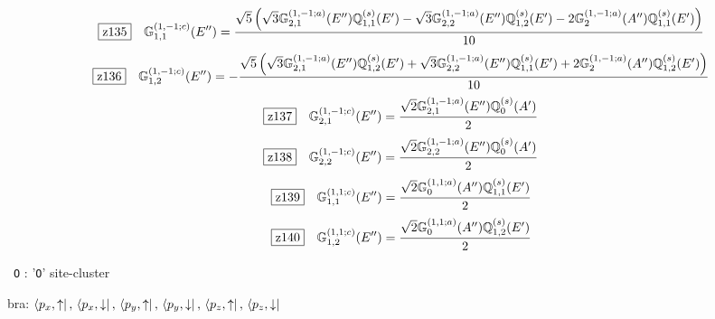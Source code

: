 \documentclass[fleqn,10pt,landscape]{jsarticle}
\begin{document}
\begin{dmath*}
\hspace*{3mm}\fbox{z135}\quad \mathbb{G}_{1,1}^{(1,-1;c)}(E^{\prime\prime})=\frac{\sqrt{5} \left(\sqrt{3} \mathbb{G}_{2,1}^{(1,-1;a)}(E^{\prime\prime}) \mathbb{Q}_{1,1}^{(s)}(E^{\prime}) - \sqrt{3} \mathbb{G}_{2,2}^{(1,-1;a)}(E^{\prime\prime}) \mathbb{Q}_{1,2}^{(s)}(E^{\prime}) - 2 \mathbb{G}_{2}^{(1,-1;a)}(A^{\prime\prime}) \mathbb{Q}_{1,1}^{(s)}(E^{\prime})\right)}{10}
\end{dmath*}
\begin{dmath*}
\hspace*{3mm}\fbox{z136}\quad \mathbb{G}_{1,2}^{(1,-1;c)}(E^{\prime\prime})=- \frac{\sqrt{5} \left(\sqrt{3} \mathbb{G}_{2,1}^{(1,-1;a)}(E^{\prime\prime}) \mathbb{Q}_{1,2}^{(s)}(E^{\prime}) + \sqrt{3} \mathbb{G}_{2,2}^{(1,-1;a)}(E^{\prime\prime}) \mathbb{Q}_{1,1}^{(s)}(E^{\prime}) + 2 \mathbb{G}_{2}^{(1,-1;a)}(A^{\prime\prime}) \mathbb{Q}_{1,2}^{(s)}(E^{\prime})\right)}{10}
\end{dmath*}
\begin{dmath*}
\hspace*{3mm}\fbox{z137}\quad \mathbb{G}_{2,1}^{(1,-1;c)}(E^{\prime\prime})=\frac{\sqrt{2} \mathbb{G}_{2,1}^{(1,-1;a)}(E^{\prime\prime}) \mathbb{Q}_{0}^{(s)}(A^{\prime})}{2}
\end{dmath*}
\begin{dmath*}
\hspace*{3mm}\fbox{z138}\quad \mathbb{G}_{2,2}^{(1,-1;c)}(E^{\prime\prime})=\frac{\sqrt{2} \mathbb{G}_{2,2}^{(1,-1;a)}(E^{\prime\prime}) \mathbb{Q}_{0}^{(s)}(A^{\prime})}{2}
\end{dmath*}
\begin{dmath*}
\hspace*{3mm}\fbox{z139}\quad \mathbb{G}_{1,1}^{(1,1;c)}(E^{\prime\prime})=\frac{\sqrt{2} \mathbb{G}_{0}^{(1,1;a)}(A^{\prime\prime}) \mathbb{Q}_{1,1}^{(s)}(E^{\prime})}{2}
\end{dmath*}
\begin{dmath*}
\hspace*{3mm}\fbox{z140}\quad \mathbb{G}_{1,2}^{(1,1;c)}(E^{\prime\prime})=\frac{\sqrt{2} \mathbb{G}_{0}^{(1,1;a)}(A^{\prime\prime}) \mathbb{Q}_{1,2}^{(s)}(E^{\prime})}{2}
\end{dmath*}
\vspace{5mm}

\noindent\textbullet\, \texttt{O} : '\texttt{O}' site-cluster

\noindent\quad * bra: $\bra{p_{x},\uparrow},\, \bra{p_{x},\downarrow},\, \bra{p_{y},\uparrow},\, \bra{p_{y},\downarrow},\, \bra{p_{z},\uparrow},\, \bra{p_{z},\downarrow}$
\end{document}
